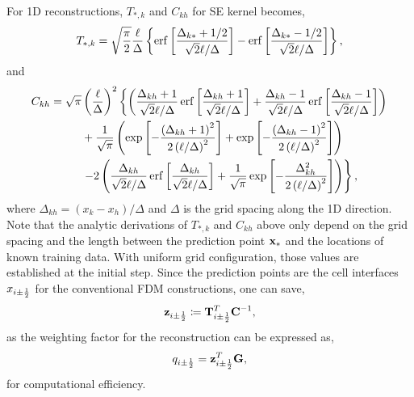 For 1D reconstructions, \( T_{*, k} \) and \( C_{kh} \) for SE kernel becomes,
\begin{equation}\label{eq:gp_se_T}
    T_{*,k} = \sqrt{\frac{\pi}{2}}\frac{\ell}{\Delta} \left \{
        \operatorname{erf} \left [ \frac{\Delta_{k*}+1/2}{\sqrt{2}\ell/\Delta} \right ]
        - \operatorname{erf} \left [ \frac{\Delta_{k*}-1/2}{\sqrt{2}\ell/\Delta} \right ]
     \right \},
\end{equation}
and
\begin{equation}\label{eq:gp_se_C}
    \begin{split}
        C_{kh} = \sqrt{\pi} & \left( \frac{\ell}{\Delta} \right)^{2}
        \left \{
            \left( \frac{\Delta_{kh} + 1}{\sqrt{2} \ell / \Delta} \operatorname{erf} \left [ \frac{\Delta_{kh} + 1}{\sqrt{2} \ell / \Delta} \right ] +
                \frac{\Delta_{kh} - 1}{\sqrt{2} \ell / \Delta} \operatorname{erf} \left [ \frac{\Delta_{kh} - 1}{\sqrt{2} \ell / \Delta} \right ]
            \right) \right. \\
            &+ \frac{1}{\sqrt{\pi}} \left(
                \exp \left[ - \frac{\left( \Delta_{kh} + 1 \right)^{2}}{2 \left( \ell / \Delta \right)^{2}} \right]
                + \exp \left[ - \frac{\left( \Delta_{kh} -1 \right)^{2}}{2 \left( \ell / \Delta \right)^{2}} \right]
            \right) \\
            &\left.
            -2 \left(
                \frac{\Delta_{kh}}{\sqrt{2} \ell / \Delta} \operatorname{erf} \left [ \frac{\Delta_{kh}}{\sqrt{2} \ell / \Delta} \right ]
                + \frac{1}{\sqrt{\pi}} \exp \left[ -\frac{\Delta_{kh}^{2}}{2 \left( \ell / \Delta \right)^{2}} \right] 
            \right)
        \right \},
    \end{split}
\end{equation}
where \( \Delta_{kh} = (x_{k} - x_{h})/\Delta \) and \( \Delta \) is the grid spacing along the 1D direction.
Note that the analytic derivations of \( T_{*, k} \) and \( C_{kh} \) above
only depend on the grid spacing and the length between the prediction point \( \mathbf{x}_{*} \)
and the locations of known training data. With uniform grid configuration,
those values are established at the initial step.
Since the prediction points are the cell interfaces \( x_{i \pm \frac{1}{2}} \)
for the conventional FDM constructions, one can save,
\begin{equation}\label{eq:gp_zvec}
    \mathbf{z}_{i \pm \frac{1}{2}} \coloneqq \mathbf{T}^{T}_{i \pm \frac{1}{2}} \mathbf{C}^{-1},
\end{equation}
as the weighting factor for the reconstruction can be expressed as,
\begin{equation}\label{eq:gp_recon_with_zvec}
    q_{i \pm \frac{1}{2}} = \mathbf{z}^{T}_{i \pm \frac{1}{2}} \mathbf{G},
\end{equation}
for computational efficiency.

